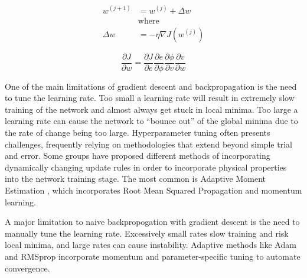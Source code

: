 \begin{equation}
    \begin{aligned}
        w^{(j+1)} &= w^{(j)} + \Delta w\\
        &\text{where} \\
        \Delta w &= -\eta \nabla J(w^{(j)})
    \end{aligned}
    \label{eq:grad-descent}
\end{equation}

\begin{equation}
    \frac{\partial J}{\partial w} = \frac{\partial J}{\partial e}\frac{\partial e}{\partial \phi}\frac{\partial \phi}{\partial v} \frac{\partial v}{\partial w}
    \label{eq:chain-rule}
\end{equation}

One of the main limitations of gradient descent and backpropagation is the need to tune the learning rate.
Too small a learning rate will result in extremely slow training of the network and almost always get stuck in local minima.
Too large a learning rate can cause the network to ``bounce out'' of the global minima due to the rate of change being too large.
Hyperparameter tuning often presents challenges, frequently relying on methodologies that extend beyond simple trial and error.
Some groups have proposed different methods of incorporating dynamically changing update rules in order to incorporate physical properties into the network training stage.
The most common is Adaptive Moment Estimation \cite{kingmaAdamMethodStochastic2017}, which incorporates Root Mean Squared Propagation \cite{hinton2012neural} and momentum learning.

A major limitation to naive backpropogation with gradient descent is the need to manually tune the learning rate.
Excessively small rates slow training and risk local minima,  and large rates can cause instability.
Adaptive methods like Adam \cite{kingmaAdamMethodStochastic2017} and RMSprop \cite{hinton2012neural} incorporate momentum and parameter-specific tuning to automate convergence.

